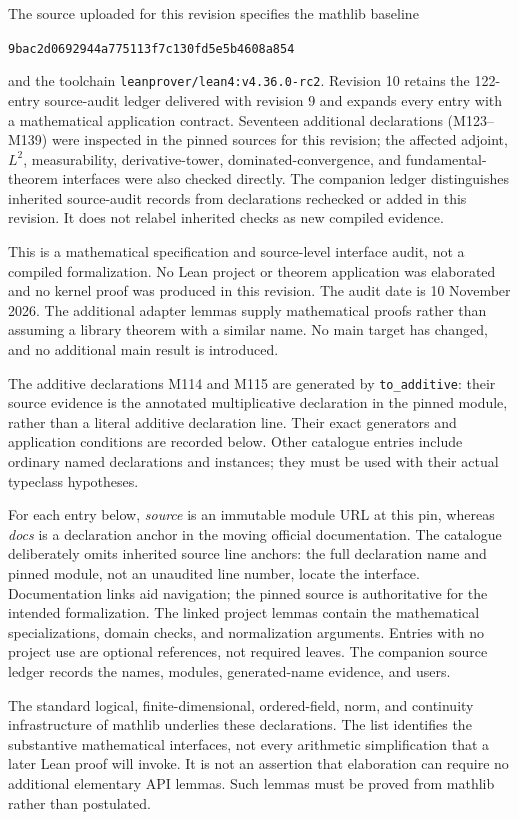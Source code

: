 \documentclass[11pt,a4paper]{article}
\theoremstyle{definition}
\theoremstyle{remark}
\begin{document}
The source uploaded for this revision specifies the mathlib baseline
\begin{center}\nolinkurl{9bac2d0692944a775113f7c130fd5e5b4608a854}\end{center}
and the toolchain \nolinkurl{leanprover/lean4:v4.36.0-rc2}.
Revision 10 retains the 122-entry source-audit ledger delivered with
revision 9 and expands every entry with a mathematical application
contract. Seventeen additional declarations (M123--M139) were inspected
in the pinned sources for this revision; the affected adjoint, $L^2$,
measurability, derivative-tower, dominated-convergence, and fundamental-
theorem interfaces were also checked directly. The companion ledger
distinguishes inherited source-audit records from declarations rechecked
or added in this revision. It does not relabel inherited checks as new
compiled evidence.

This is a mathematical specification and source-level interface audit,
not a compiled formalization. No Lean project or theorem application
was elaborated and no kernel proof was produced in this revision.
The audit date is 10 November 2026. The additional adapter lemmas
supply mathematical proofs rather than assuming a library theorem with
a similar name. No main target has changed, and no additional main
result is introduced.

The additive declarations M114 and M115 are generated by
\nolinkurl{to_additive}: their source evidence is the annotated
multiplicative declaration in the pinned module, rather than a literal
additive declaration line. Their exact generators and application
conditions are recorded below. Other catalogue entries include
ordinary named declarations and instances; they must be used with
their actual typeclass hypotheses.

For each entry below, \emph{source} is an immutable module URL at this
pin, whereas \emph{docs} is a declaration anchor in the moving official
documentation. The catalogue deliberately omits inherited source line
anchors: the full declaration name and pinned module, not an unaudited
line number, locate the interface. Documentation links aid navigation;
the pinned source is authoritative for the intended formalization.
The linked project lemmas contain the mathematical specializations,
domain checks, and normalization arguments. Entries with no project
use are optional references, not required leaves. The companion source
ledger records the names, modules, generated-name evidence, and users.

The standard logical, finite-dimensional, ordered-field, norm, and
continuity infrastructure of mathlib underlies these declarations.
The list identifies the substantive mathematical interfaces, not every
arithmetic simplification that a later Lean proof will invoke. It is not
an assertion that elaboration can require no additional elementary API
lemmas. Such lemmas must be proved from mathlib rather than postulated.
\end{document}
